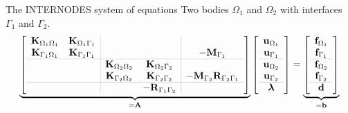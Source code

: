 \documentclass[aspectratio=169, xcolor={svgnames}]{beamer}
\begin{document}
\begin{frame}{The INTERNODES system of equations}
    Two bodies $\Omega_1$ and $\Omega_2$ with interfaces $\Gamma_1$ and $\Gamma_2$.
    \begin{equation}
    \underbrace{
    \begin{bmatrix}
    \setlength\arrayrulewidth{.1pt}
    \begin{array}{cc|cc|c}
        \mathbf{K}_{\Omega_1\Omega_1} & \mathbf{K}_{\Omega_1\Gamma_1} & & &  \\
        \mathbf{K}_{\Gamma_1\Omega_1} & \mathbf{K}_{\Gamma_1\Gamma_1} & &  & - \mathbf{M}_{\Gamma_1} \\ \hline
         & & \mathbf{K}_{\Omega_2\Omega_2} & \mathbf{K}_{\Omega_2\Gamma_2} &  \\
         & & \mathbf{K}_{\Gamma_2\Omega_2} & \mathbf{K}_{\Gamma_2\Gamma_2} & -\mathbf{M}_{\Gamma_2} \mathbf{R}_{\Gamma_2 \Gamma_1} \\ \hline
         & & & -\mathbf{R}_{\Gamma_1 \Gamma_2} & 
    \end{array}
    \end{bmatrix}
    }_{=\mathbf{A}}
    \begin{bmatrix}
    \setlength\arrayrulewidth{.1pt}
    \begin{array}{c}
        \mathbf{u}_{\Omega_1} \\
        \mathbf{u}_{\Gamma_1} \\ \hline
        \mathbf{u}_{\Omega_2} \\
        \mathbf{u}_{\Gamma_2} \\ \hline
        \boldsymbol{\lambda} \\
    \end{array}
    \end{bmatrix}
    =
    \underbrace{
    \begin{bmatrix}
    \setlength\arrayrulewidth{.1pt}
    \begin{array}{c}
        \mathbf{f}_{\Omega_1} \\
        \mathbf{f}_{\Gamma_1} \\ \hline
        \mathbf{f}_{\Omega_2} \\
        \mathbf{f}_{\Gamma_2} \\ \hline
        \mathbf{d} \\
    \end{array}
    \end{bmatrix}
    }_{=\mathbf{b}}
    \label{equ:linear-system}
    \end{equation}
    
    \centering
    \scalebox{0.6}{}
\end{frame}
\end{document}
